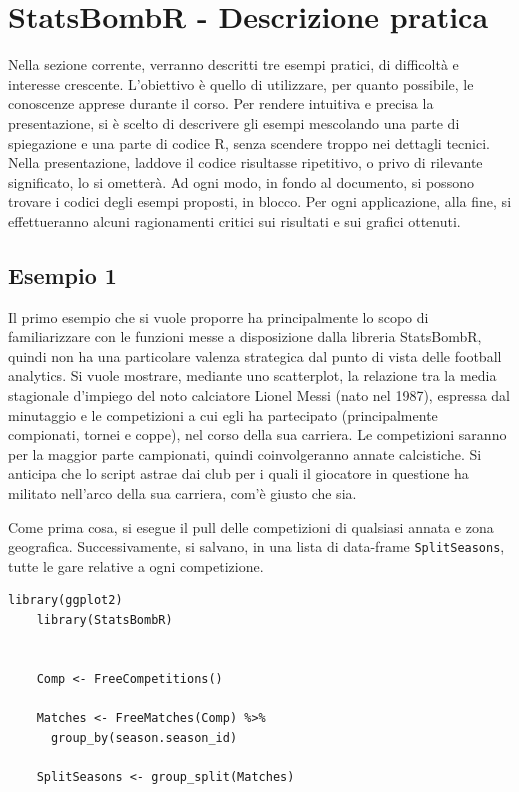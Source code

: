 \section{StatsBombR - Descrizione pratica}
        Nella sezione corrente, verranno descritti tre esempi pratici, di difficoltà e interesse crescente. L'obiettivo è quello di utilizzare, per quanto possibile, le conoscenze apprese durante il corso. Per rendere intuitiva e precisa la presentazione, si è scelto di descrivere gli esempi mescolando una parte di spiegazione e una parte di codice R, senza scendere troppo nei dettagli tecnici. Nella presentazione, laddove il codice risultasse ripetitivo, o privo di rilevante significato, lo si ometterà. Ad ogni modo, in fondo al documento, si possono trovare i codici degli esempi proposti, in blocco. Per ogni applicazione, alla fine, si effettueranno alcuni ragionamenti critici sui risultati e sui grafici ottenuti.
        
        \subsection{Esempio 1}
            Il primo esempio che si vuole proporre ha principalmente lo scopo di familiarizzare con le funzioni messe a disposizione dalla libreria StatsBombR, quindi non ha una particolare valenza strategica dal punto di vista delle football analytics. Si vuole mostrare, mediante uno scatterplot, la relazione tra la media stagionale d'impiego del noto calciatore Lionel Messi (nato nel 1987), espressa dal minutaggio e le competizioni a cui egli ha partecipato (principalmente compionati, tornei e coppe), nel corso della sua carriera. Le competizioni saranno per la maggior parte campionati, quindi coinvolgeranno annate calcistiche. Si anticipa che lo script astrae dai club per i quali il giocatore in questione ha militato nell'arco della sua carriera, com'è giusto che sia.   

            Come prima cosa, si esegue il pull delle competizioni di qualsiasi annata e zona geografica. Successivamente, si salvano, in una lista di data-frame \texttt{SplitSeasons}, tutte le gare relative a ogni competizione.

            \vspace{5pt}
            
            \begin{lstlisting}[numbers=None]
    library(ggplot2)
    library(StatsBombR)
    
    
    Comp <- FreeCompetitions()
    
    Matches <- FreeMatches(Comp) %>%
      group_by(season.season_id)
      
    SplitSeasons <- group_split(Matches)
            \end{lstlisting}

